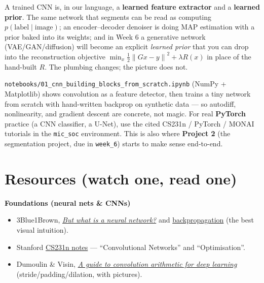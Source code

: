 \documentclass[11pt]{article}
\newcommand{\norm}[1]{\left\lVert #1 \right\rVert}
\begin{document}
A trained CNN is, in our language, a \textbf{learned feature extractor} and a
\textbf{learned prior}. The same network that segments can be read as computing
$p(\text{label}\mid\text{image})$; an encoder--decoder denoiser is doing MAP
estimation with a prior baked into its weights; and in Week 6 a generative
network (VAE/GAN/diffusion) will become an explicit \emph{learned prior} that you
can drop into the reconstruction objective
$\min_x \tfrac12\norm{Gx-y}^2 + \lambda R(x)$ in place of the hand-built $R$. The
plumbing changes; the picture does not.

\begin{keybox}
\texttt{notebooks/01\_cnn\_building\_blocks\_from\_scratch.ipynb} (NumPy +
Matplotlib) shows convolution as a feature detector, then trains a tiny network
from scratch with hand-written backprop on synthetic data --- so autodiff,
nonlinearity, and gradient descent are concrete, not magic. For real
\textbf{PyTorch} practice (a CNN classifier, a U-Net), use the cited CS231n /
PyTorch / MONAI tutorials in the \texttt{mic\_soc} environment. This is also where
\textbf{Project 2} (the segmentation project, due in \texttt{week\_6}) starts to
make sense end-to-end.
\end{keybox}

\section*{Resources (watch one, read one)}

\textbf{Foundations (neural nets \& CNNs)}
\begin{itemize}[nosep,leftmargin=*]
  \item 3Blue1Brown, \href{https://www.youtube.com/watch?v=aircAruvnKk}{\emph{But what is a neural network?}} and \href{https://www.youtube.com/watch?v=tIeHLnjs5U8}{backpropagation} (the best visual intuition).
  \item Stanford \href{https://cs231n.github.io/}{CS231n notes} --- ``Convolutional Networks'' and ``Optimisation''.
  \item Dumoulin \& Visin, \href{https://arxiv.org/abs/1603.07285}{\emph{A guide to convolution arithmetic for deep learning}} (stride/padding/dilation, with pictures).
\end{itemize}
\end{document}
